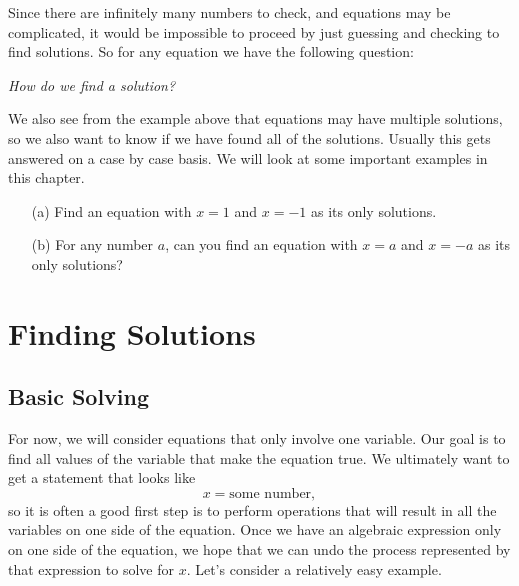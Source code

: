 Since there are infinitely many numbers to check, and equations may be complicated, it would be impossible to proceed by just guessing and checking to find solutions. So for any equation we have the following question:
\\
\begin{center}
\it{How do we find a solution?}\ \normalfont 
\end{center}
We also see from the example above that equations may have multiple solutions, so we also want to  know if we have found all of the solutions. Usually this gets answered on a case by case basis.   We will look at some important examples in this chapter.
   

\par

\begin{question}\begin{enumerate}
    \item[(a)] 
 Find an equation with $x=1$ and $x=-1$ as its only solutions.

\item[(b)] For any number $a$, can you find an equation with $x=a$ and $x=-a$ as its only solutions?\end{enumerate}
\end{question}
   

\section{Finding Solutions}
\subsection{Basic Solving}
For  now, we will consider equations that only involve one variable. Our goal is to find all values of the variable that make the equation true.  We ultimately want to get a statement that looks like
\[
x=\mbox{some number},
\]
so it is often a good first step is to perform operations that will result in all the variables on one side of the equation. Once we have an algebraic expression only on one side of the equation, we hope that we can undo the process represented by that expression to solve for $x$. Let's consider a relatively easy example.

\par

